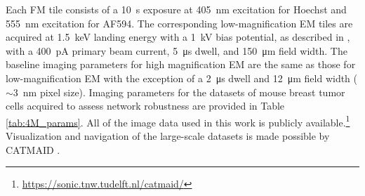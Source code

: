 Each FM tile consists of a \SI{10}{\second} exposure at \SI{405}{\nano\meter} excitation for Hoechst and \SI{555}{\nano\meter} excitation for AF594. The corresponding low-magnification EM tiles are acquired at \SI{1.5}{\kilo\electronvolt} landing energy with a \SI{1}{\kilo\volt} bias potential, as described in \textcite{lane2021optimization}, with a \SI{400}{\pico\ampere} primary beam current, \SI{5}{\micro\second} dwell, and \SI{150}{\micro\meter} field width. The baseline imaging parameters for high magnification EM are the same as those for low-magnification EM with the exception of a \SI{2}{\micro\second} dwell and \SI{12}{\micro\meter} field width (${\sim}$\SI{3}{\nano\meter} pixel size). Imaging parameters for the datasets of mouse breast tumor cells acquired to assess network robustness are provided in Table \ref{tab:4M_params}. All of the image data used in this work is publicly available.\footnote{\href{https://sonic.tnw.tudelft.nl/catmaid/}{https://sonic.tnw.tudelft.nl/catmaid/}} Visualization and navigation of the large-scale datasets is made possible by CATMAID \cite{saalfeld2009catmaid}.

